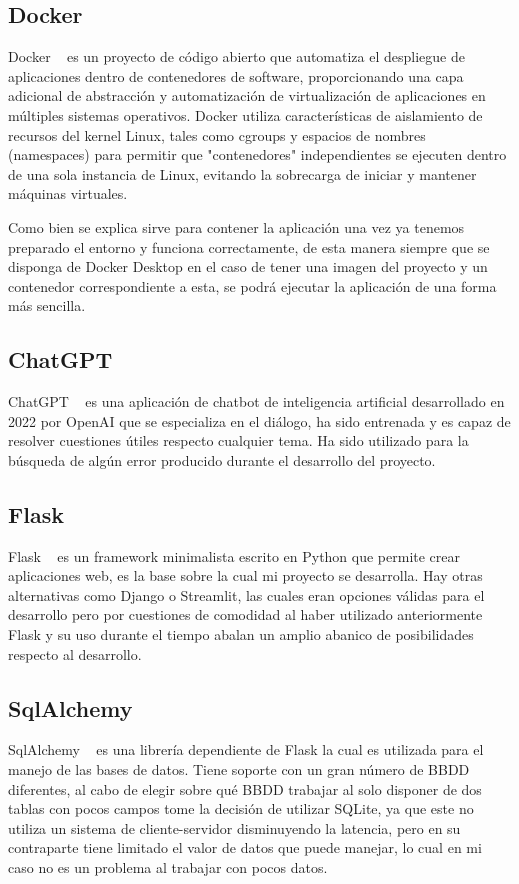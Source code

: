 \subsection{Docker}
Docker ~\cite{wiki:Docker} es un proyecto de código abierto que automatiza el despliegue de aplicaciones dentro de contenedores de software, proporcionando una capa adicional de abstracción y automatización de virtualización de aplicaciones en múltiples sistemas operativos. Docker utiliza características de aislamiento de recursos del kernel Linux, tales como cgroups y espacios de nombres (namespaces) para permitir que "contenedores" independientes se ejecuten dentro de una sola instancia de Linux, evitando la sobrecarga de iniciar y mantener máquinas virtuales.

Como bien se explica sirve para contener la aplicación una vez ya tenemos preparado el entorno y funciona correctamente, de esta manera siempre que se disponga de Docker Desktop en el caso de tener una imagen del proyecto y un contenedor correspondiente a esta, se podrá ejecutar la aplicación de una forma más sencilla.
\subsection{ChatGPT}
ChatGPT ~\cite{wiki:ChatGPT} es una aplicación de chatbot de inteligencia artificial desarrollado en 2022 por OpenAI que se especializa en el diálogo, ha sido entrenada y es capaz de resolver cuestiones útiles respecto cualquier tema.
Ha sido utilizado para la búsqueda de algún error producido durante el desarrollo del proyecto.
\subsection{Flask}
Flask ~\cite{wiki:Flask} es un framework minimalista escrito en Python que permite crear aplicaciones web, es la base sobre la cual mi proyecto se desarrolla. 
Hay otras alternativas como Django o Streamlit, las cuales eran opciones válidas para el desarrollo pero por cuestiones de comodidad al haber utilizado anteriormente Flask y su uso durante el tiempo abalan un amplio abanico de posibilidades respecto al desarrollo. 
\subsection{SqlAlchemy}
SqlAlchemy ~\cite{Flask:SQLAlchemy} es una librería dependiente de Flask la cual es utilizada para el manejo de las bases de datos.
Tiene soporte con un gran número de BBDD diferentes, al cabo de elegir sobre qué BBDD trabajar al solo disponer de dos tablas con pocos campos tome la decisión de utilizar SQLite, ya que este no utiliza un sistema de cliente-servidor disminuyendo la latencia, pero en su contraparte tiene limitado el valor de datos que puede manejar, lo cual en mi caso no es un problema al trabajar con pocos datos.
